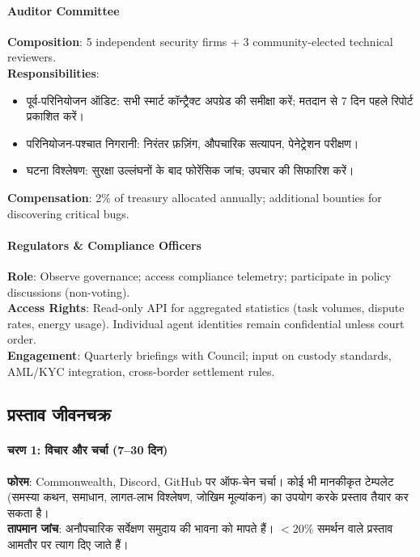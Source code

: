 \documentclass[11pt]{article}
\begin{document}
\begin{itemize}[noitemsep]
\begin{itemize}[noitemsep]
\begin{itemize}[noitemsep]
\begin{itemize}[noitemsep]
\begin{itemize}[noitemsep]
\paragraph{Auditor Committee}
\textbf{Composition}: 5 independent security firms + 3 community-elected technical reviewers.\\
\textbf{Responsibilities}:
\begin{itemize}[noitemsep]
  \item पूर्व-परिनियोजन ऑडिट: सभी स्मार्ट कॉन्ट्रैक्ट अपग्रेड की समीक्षा करें; मतदान से 7 दिन पहले रिपोर्ट प्रकाशित करें।
  \item परिनियोजन-पश्चात निगरानी: निरंतर फ़ज़िंग, औपचारिक सत्यापन, पेनेट्रेशन परीक्षण।
  \item घटना विश्लेषण: सुरक्षा उल्लंघनों के बाद फोरेंसिक जांच; उपचार की सिफारिश करें।
\end{itemize}
\textbf{Compensation}: 2\% of treasury allocated annually; additional bounties for discovering critical bugs.

\paragraph{Regulators \& Compliance Officers}
\textbf{Role}: Observe governance; access compliance telemetry; participate in policy discussions (non-voting).\\
\textbf{Access Rights}: Read-only API for aggregated statistics (task volumes, dispute rates, energy usage). Individual agent identities remain confidential unless court order.\\
\textbf{Engagement}: Quarterly briefings with Council; input on custody standards, AML/KYC integration, cross-border settlement rules.

\subsection{प्रस्ताव जीवनचक्र}

\paragraph{चरण 1: विचार और चर्चा (7--30 दिन)}
\textbf{फोरम}: Commonwealth, Discord, GitHub पर ऑफ-चेन चर्चा। कोई भी मानकीकृत टेम्पलेट (समस्या कथन, समाधान, लागत-लाभ विश्लेषण, जोखिम मूल्यांकन) का उपयोग करके प्रस्ताव तैयार कर सकता है।\\
\textbf{तापमान जांच}: अनौपचारिक सर्वेक्षण समुदाय की भावना को मापते हैं। $<20\%$ समर्थन वाले प्रस्ताव आमतौर पर त्याग दिए जाते हैं।


\end{itemize}
\end{itemize}
\end{itemize}
\end{itemize}
\end{itemize}
\end{document}
